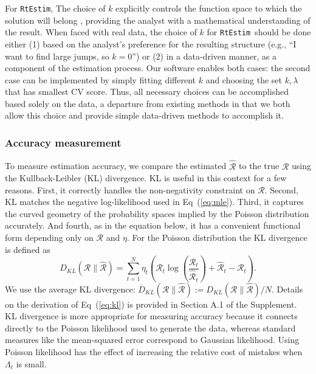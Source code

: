 \documentclass[10pt,letterpaper]{article}
\newcommand{\lr}[1]{\left(#1\right)}
\def\RtEstim{\texttt{RtEstim}}
\def\calR{\mathcal{R}}
\renewcommand{\eqref}[1]{Eq~(\ref{#1})}
\begin{document}
For \RtEstim, The choice of $k$ explicitly controls the function space to which
the solution will belong \cite{tibshirani2022divided}, providing the analyst
with a mathematical understanding of the result. When faced with real data, the
choice of $k$ for \RtEstim\ should be done either (1) based on the analyst's
preference for the resulting structure (e.g., ``I want to find large jumps, so
$k=0$'') or (2) in a data-driven manner, as a component of the estimation
process.  Our software enables both cases: the second case can be implemented by
simply fitting different $k$ and choosing the set $k,\lambda$ that has smallest
CV score. Thus, all necessary choices can be accomplished based solely on the
data, a departure from existing methods in that we both allow this choice and
provide simple data-driven methods to accomplish it.

\subsubsection{Accuracy measurement}

To measure estimation accuracy, we compare the estimated $\widehat{\calR}$ to
the true $\calR$ using the Kullback-Leibler (KL) divergence. KL is useful in
this context for a few reasons. First, it correctly handles the non-negativity
constraint on $\calR$. Second, KL matches the negative log-likelihood used in
\eqref{eq:mle}. Third, it captures the curved geometry of the probability spaces
implied by the Poisson distribution accurately. And fourth, as in the equation
below, it has a convenient functional form depending only on $\calR$ and $\eta$.
For the Poisson distribution the KL divergence is defined as
\begin{equation} \label{eq:kl}
  D_{KL}(\calR \parallel \widehat{\calR}) = \sum_{t=1}^N \eta_t \lr{\calR_t
  \log\left(\frac{\calR_t} {\widehat{\calR}_t}\right) + \widehat{\calR}_t -
{\calR}_t}.
\end{equation}
We use the average KL divergence: $\overline{D}_{KL}(\calR \parallel
\widehat{\calR}) := D_{KL}(\calR \parallel \widehat{\calR}) / N$. Details on the
derivation of \eqref{eq:kl} is provided in Section A.1 of the Supplement. KL
divergence is more appropriate for measuring accuracy because it connects
directly to the Poisson likelihood used to generate the data, whereas standard
measures like the mean-squared error correspond to Gaussian likelihood. Using
Poisson likelihood has the effect of increasing the relative cost of mistakes
when $\Lambda_t$ is small. 
\end{document}

